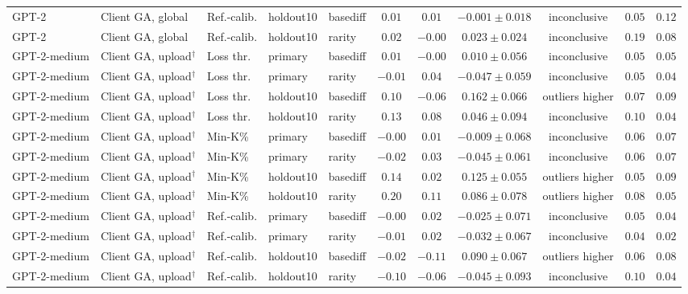 \begin{table}[t]
\begin{tabular*}{\textwidth}{@{\extracolsep{\fill}}lllllcccccc@{}}
GPT-2 & Client GA, global & Ref.-calib. & holdout10 & basediff & $0.01$ & $0.01$ & $-0.001 \pm 0.018$ & inconclusive & $0.05$ & $0.12$ \\
GPT-2 & Client GA, global & Ref.-calib. & holdout10 & rarity & $0.02$ & $-0.00$ & $0.023 \pm 0.024$ & inconclusive & $0.19$ & $0.08$ \\
GPT-2-medium & Client GA, upload$^{\dagger}$ & Loss thr. & primary & basediff & $0.01$ & $-0.00$ & $0.010 \pm 0.056$ & inconclusive & $0.05$ & $0.05$ \\
GPT-2-medium & Client GA, upload$^{\dagger}$ & Loss thr. & primary & rarity & $-0.01$ & $0.04$ & $-0.047 \pm 0.059$ & inconclusive & $0.05$ & $0.04$ \\
GPT-2-medium & Client GA, upload$^{\dagger}$ & Loss thr. & holdout10 & basediff & $0.10$ & $-0.06$ & $0.162 \pm 0.066$ & outliers higher & $0.07$ & $0.09$ \\
GPT-2-medium & Client GA, upload$^{\dagger}$ & Loss thr. & holdout10 & rarity & $0.13$ & $0.08$ & $0.046 \pm 0.094$ & inconclusive & $0.10$ & $0.04$ \\
GPT-2-medium & Client GA, upload$^{\dagger}$ & Min-K\% & primary & basediff & $-0.00$ & $0.01$ & $-0.009 \pm 0.068$ & inconclusive & $0.06$ & $0.07$ \\
GPT-2-medium & Client GA, upload$^{\dagger}$ & Min-K\% & primary & rarity & $-0.02$ & $0.03$ & $-0.045 \pm 0.061$ & inconclusive & $0.06$ & $0.07$ \\
GPT-2-medium & Client GA, upload$^{\dagger}$ & Min-K\% & holdout10 & basediff & $0.14$ & $0.02$ & $0.125 \pm 0.055$ & outliers higher & $0.05$ & $0.09$ \\
GPT-2-medium & Client GA, upload$^{\dagger}$ & Min-K\% & holdout10 & rarity & $0.20$ & $0.11$ & $0.086 \pm 0.078$ & outliers higher & $0.08$ & $0.05$ \\
GPT-2-medium & Client GA, upload$^{\dagger}$ & Ref.-calib. & primary & basediff & $-0.00$ & $0.02$ & $-0.025 \pm 0.071$ & inconclusive & $0.05$ & $0.04$ \\
GPT-2-medium & Client GA, upload$^{\dagger}$ & Ref.-calib. & primary & rarity & $-0.01$ & $0.02$ & $-0.032 \pm 0.067$ & inconclusive & $0.04$ & $0.02$ \\
GPT-2-medium & Client GA, upload$^{\dagger}$ & Ref.-calib. & holdout10 & basediff & $-0.02$ & $-0.11$ & $0.090 \pm 0.067$ & outliers higher & $0.06$ & $0.08$ \\
GPT-2-medium & Client GA, upload$^{\dagger}$ & Ref.-calib. & holdout10 & rarity & $-0.10$ & $-0.06$ & $-0.045 \pm 0.093$ & inconclusive & $0.10$ & $0.04$ \\

\end{tabular*}
\end{table}
